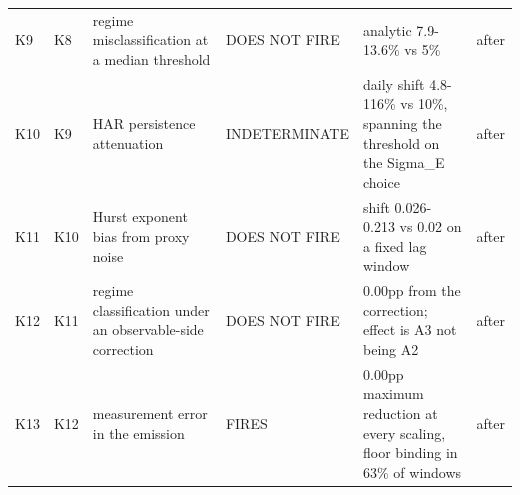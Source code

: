 \begin{table}[!ht]
\begin{tabular}{@{}ll>{\raggedright\arraybackslash}p{3.3cm}>{\raggedright\arraybackslash}p{3.0cm}>{\raggedright\arraybackslash}p{4.3cm}c@{}}
K9 & K8 & regime misclassification at a median threshold & DOES NOT FIRE & analytic 7.9-13.6\% vs 5\% & after \\  %
K10 & K9 & HAR persistence attenuation & INDETER\-MINATE & daily shift 4.8-116\% vs 10\%, spanning the threshold on the Sigma\_E choice & after \\  %
K11 & K10 & Hurst exponent bias from proxy noise & DOES NOT FIRE & shift 0.026-0.213 vs 0.02 on a fixed lag window & after \\  %
K12 & K11 & regime classification under an observable-side correction & DOES NOT FIRE & 0.00pp from the correction; effect is A3 not being A2 & after \\  %
K13 & K12 & measurement error in the emission & FIRES & 0.00pp maximum reduction at every scaling, floor binding in 63\% of windows & after \\  %
\bottomrule
\end{tabular}
\end{table}

